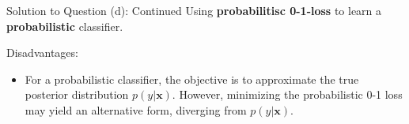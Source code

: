 \documentclass[aspectratio=169]{beamer}
\begin{document}
\begin{frame}{Solution to Question (d): Continued}
Using \textbf{probabilitisc 0-1-loss} to learn a \textbf{probabilistic} classifier.

Disadvantages:
\begin{itemize}
    \item<2-> For a probabilistic classifier, the objective is to approximate the true posterior distribution $p(y|\mathbf{x})$. However, minimizing the probabilistic 0-1 loss may yield an alternative form, diverging from $p(y|\mathbf{x})$.
\end{itemize}

\end{frame}
\end{document}
